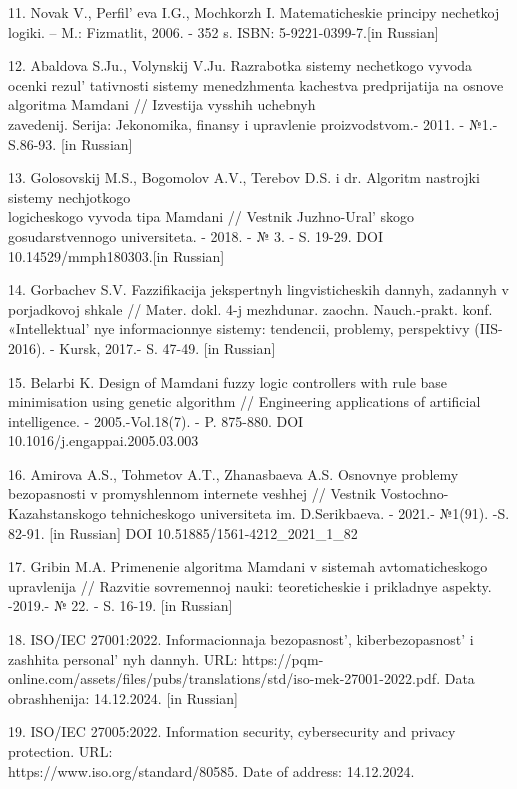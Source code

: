 \begin{references}
11. Novak V., Perfil' eva I.G., Mochkorzh I.
Matematicheskie principy nechetkoj logiki. -- M.: Fizmatlit, 2006. - 352
s. ISBN: 5-9221-0399-7.{[}in Russian{]}

12. Abaldova S.Ju., Volynskij V.Ju. Razrabotka sistemy nechetkogo vyvoda
ocenki rezul' tativnosti sistemy menedzhmenta kachestva
predprijatija na osnove algoritma Mamdani // Izvestija vysshih uchebnyh\\
zavedenij. Serija: Jekonomika, finansy i upravlenie proizvodstvom.-
2011. - №1.- S.86-93. {[}in Russian{]}

13. Golosovskij M.S., Bogomolov A.V., Terebov D.S. i dr. Algoritm
nastrojki sistemy nechjotkogo \\logicheskogo vyvoda tipa Mamdani //
Vestnik Juzhno-Ural' skogo gosudarstvennogo universiteta.
- 2018. - № 3. - S. 19-29. DOI 10.14529/mmph180303.{[}in Russian{]}

14. Gorbachev S.V. Fazzifikacija jekspertnyh lingvisticheskih dannyh,
zadannyh v porjadkovoj shkale // Mater. dokl. 4-j mezhdunar. zaochn.
Nauch.-prakt. konf. «Intellektual' nye informacionnye
sistemy: tendencii, problemy, perspektivy (IIS-2016). - Kursk, 2017.- S.
47-49. {[}in Russian{]}

15. Belarbi K. Design of Mamdani fuzzy logic controllers with rule base
minimisation using genetic algorithm // Engineering applications of
artificial intelligence. - 2005.-Vol.18(7). - P. 875-880. DOI\\
10.1016/j.engappai.2005.03.003

16. Amirova A.S., Tohmetov A.T., Zhanasbaeva A.S. Osnovnye problemy
bezopasnosti v promyshlennom internete veshhej // Vestnik
Vostochno-Kazahstanskogo tehnicheskogo universiteta im. D.Serikbaeva. -
2021.- №1(91). -S. 82-91. {[}in Russian{]}
DOI 10.51885/1561-4212\_2021\_1\_82

17. Gribin M.A. Primenenie algoritma Mamdani v sistemah avtomaticheskogo
upravlenija // Razvitie sovremennoj nauki: teoreticheskie i prikladnye
aspekty. -2019.- № 22. - S. 16-19. {[}in Russian{]}

18. ISO/IEC 27001:2022. Informacionnaja bezopasnost',
kiberbezopasnost'{} i zashhita
personal' nyh dannyh. URL:
https://pqm-online.com/assets/files/pubs/translations/std/iso-mek-27001-2022.pdf.
Data \\obrashhenija: 14.12.2024. {[}in Russian{]}

19. ISO/IEC 27005:2022. Information security, cybersecurity and privacy
protection. URL: \\https://www.iso.org/standard/80585. Date of address:
14.12.2024.


\end{references}
